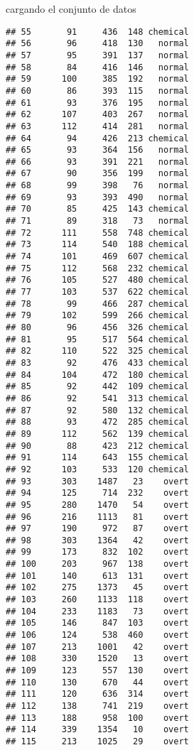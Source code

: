 \documentclass[ignorenonframetext,]{beamer}
\begin{document}
\begin{frame}[fragile]{cargando el conjunto de datos}
\begin{verbatim}
## 55       91     436  148 chemical
## 56       96     418  130   normal
## 57       95     391  137   normal
## 58       84     416  146   normal
## 59      100     385  192   normal
## 60       86     393  115   normal
## 61       93     376  195   normal
## 62      107     403  267   normal
## 63      112     414  281   normal
## 64       94     426  213 chemical
## 65       93     364  156   normal
## 66       93     391  221   normal
## 67       90     356  199   normal
## 68       99     398   76   normal
## 69       93     393  490   normal
## 70       85     425  143 chemical
## 71       89     318   73   normal
## 72      111     558  748 chemical
## 73      114     540  188 chemical
## 74      101     469  607 chemical
## 75      112     568  232 chemical
## 76      105     527  480 chemical
## 77      103     537  622 chemical
## 78       99     466  287 chemical
## 79      102     599  266 chemical
## 80       96     456  326 chemical
## 81       95     517  564 chemical
## 82      110     522  325 chemical
## 83       92     476  433 chemical
## 84      104     472  180 chemical
## 85       92     442  109 chemical
## 86       92     541  313 chemical
## 87       92     580  132 chemical
## 88       93     472  285 chemical
## 89      112     562  139 chemical
## 90       88     423  212 chemical
## 91      114     643  155 chemical
## 92      103     533  120 chemical
## 93      303    1487   23    overt
## 94      125     714  232    overt
## 95      280    1470   54    overt
## 96      216    1113   81    overt
## 97      190     972   87    overt
## 98      303    1364   42    overt
## 99      173     832  102    overt
## 100     203     967  138    overt
## 101     140     613  131    overt
## 102     275    1373   45    overt
## 103     260    1133  118    overt
## 104     233    1183   73    overt
## 105     146     847  103    overt
## 106     124     538  460    overt
## 107     213    1001   42    overt
## 108     330    1520   13    overt
## 109     123     557  130    overt
## 110     130     670   44    overt
## 111     120     636  314    overt
## 112     138     741  219    overt
## 113     188     958  100    overt
## 114     339    1354   10    overt
## 115     213    1025   29    overt
\end{verbatim}

\end{frame}
\end{document}
